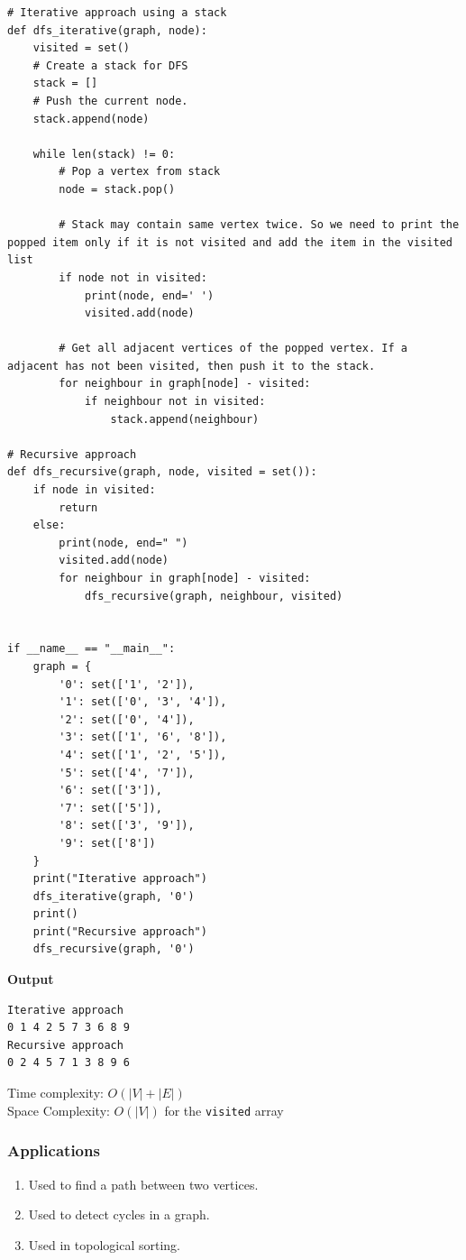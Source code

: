\documentclass[a4paper,11pt]{book}
\begin{document}
\begin{lstlisting}
# Iterative approach using a stack
def dfs_iterative(graph, node):            
    visited = set()
    # Create a stack for DFS
    stack = []
    # Push the current node.
    stack.append(node)

    while len(stack) != 0:
        # Pop a vertex from stack
        node = stack.pop()

        # Stack may contain same vertex twice. So we need to print the popped item only if it is not visited and add the item in the visited list
        if node not in visited:
            print(node, end=' ')
            visited.add(node)
            
        # Get all adjacent vertices of the popped vertex. If a adjacent has not been visited, then push it to the stack.
        for neighbour in graph[node] - visited:
            if neighbour not in visited:
                stack.append(neighbour)

# Recursive approach
def dfs_recursive(graph, node, visited = set()):
    if node in visited:
        return
    else:
        print(node, end=" ")
        visited.add(node)
        for neighbour in graph[node] - visited:
            dfs_recursive(graph, neighbour, visited)


if __name__ == "__main__":
    graph = {
        '0': set(['1', '2']),
        '1': set(['0', '3', '4']),
        '2': set(['0', '4']),
        '3': set(['1', '6', '8']),
        '4': set(['1', '2', '5']),
        '5': set(['4', '7']),
        '6': set(['3']),
        '7': set(['5']),
        '8': set(['3', '9']),
        '9': set(['8'])
    }
    print("Iterative approach")
    dfs_iterative(graph, '0')
    print()
    print("Recursive approach")
    dfs_recursive(graph, '0')
\end{lstlisting}
\textbf{Output}
\begin{lstlisting}
Iterative approach
0 1 4 2 5 7 3 6 8 9 
Recursive approach
0 2 4 5 7 1 3 8 9 6
\end{lstlisting}

\noindent Time complexity: $O(|V| + |E|)$\\
\noindent Space Complexity: $O(|V|)$ for the \lstinline{visited} array

\subsubsection{Applications}

\begin{enumerate}
    \item Used to find a path between two vertices.
\item Used to detect cycles in a graph.
\item Used in topological sorting.
\end{enumerate}
\end{document}
